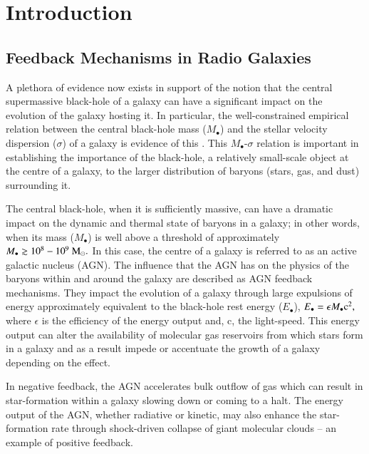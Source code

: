 \chapter{Introduction}

\section{Feedback Mechanisms in Radio Galaxies}

A plethora of evidence now exists in support of the notion that the central supermassive black-hole of a galaxy can have a significant impact on the evolution of the galaxy hosting it. In particular, the well-constrained empirical relation between the central black-hole mass ($M_\bullet$) and the stellar velocity dispersion ($\sigma$) of a galaxy is evidence of this \citep{kormendy2013}. This $M_\bullet$-$\sigma$ relation is important in establishing the importance of the black-hole, a relatively small-scale object at the centre of a galaxy, to the larger distribution of baryons (stars, gas, and dust) surrounding it.

The central black-hole, when it is sufficiently massive, can have a dramatic impact on the dynamic and thermal state of baryons in a galaxy; in other words, when its mass ($M_\bullet$) is well above a threshold of approximately $M_\bullet \gtrsim 10^8 - 10^9~\rm M_\odot.$ In this case, the centre of a galaxy is referred to as an active galactic nucleus (AGN). The influence that the AGN has on the physics of the baryons within and around the galaxy are described as AGN feedback mechanisms. They impact the evolution of a galaxy through large expulsions of energy approximately equivalent to the black-hole rest energy ($E_\bullet$), $E_\bullet = \epsilon M_\bullet \rm{c}^2,$ where $\epsilon$ is the efficiency of the energy output and, c, the light-speed. This energy output can alter the availability of molecular gas reservoirs from which stars form in a galaxy and as a result impede or accentuate the growth of a galaxy depending on the effect. 

In negative feedback, the AGN accelerates bulk outflow of gas which can result in star-formation within a galaxy slowing down or coming to a halt. The energy output of the AGN, whether radiative or kinetic, may also enhance the star-formation rate through shock-driven collapse of giant molecular clouds -- an example of positive feedback. 

